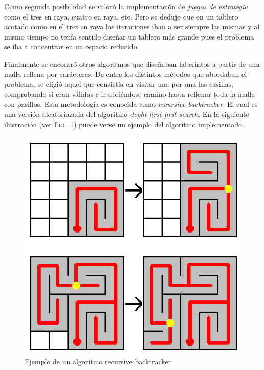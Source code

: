 \documentclass[12pt,a4paper]{article}
\begin{document}
Como segunda posibilidad se valoró la implementación de \textit{juegos de estrategia} como el tres en raya, cuatro en raya, etc. Pero se dedujo que en un tablero acotado como en el tres en raya las iteraciones iban a ser siempre las mismas y al mismo tiempo no tenía sentido diseñar un tablero más grande pues el problema se iba a concentrar en un espacio reducido.

\vspace{0.3cm}

Finalmente se encontró otros algoritmos que diseñaban laberintos a partir de una malla rellena por carácteres. De entre los distintos métodos que abordaban el problema, se eligió aquel que consistía en visitar una por una las casillas, comprobando si eran válidas e ir abriéndose camino hasta rellenar toda la malla con pasillos. Esta metodología es conocida como \textit{recursive backtracker}\cite{wiki}. El cual es una versión aleatoriazada del algoritmo \textit{depht first-first search}. En la siguiente ilustración (ver \textsc{Fig.}~\ref{back_tracker_label}) puede verse un ejemplo del algoritmo implementado.

\begin{figure}[H]
	\centering
	\includegraphics[scale=0.4]{fotos/back_tracker.png}
	\caption{Ejemplo de un algoritmo recursive backtracker \cite{back_tracker}}
	\label{back_tracker_label}
\end{figure}
\end{document}
